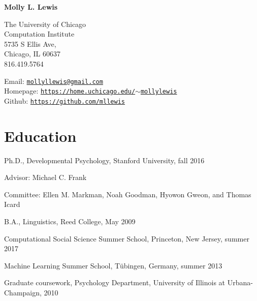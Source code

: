 \documentclass[letterpaper]{article}
\def\name{Molly L.  Lewis}
\renewenvironment{itemize}{
  \begin{list}{}{
    \setlength{\leftmargin}{1.5em}
  }
}{
  \end{list}
}
\begin{document}
\centerline{\huge \bf \name}
\vspace{0.25in}


 \normalsize
  
  The University of Chicago  \\
  Computation Institute \\
  5735 S Ellis Ave,\\
 Chicago, IL 60637\\
 816.419.5764\\
  
  \begin{minipage}{0.45\linewidth}

Email: \href{mailto:mollyllewis@gmail.com}{\tt mollyllewis@gmail.com}\\
Homepage: \href{http://home.uchicago.edu/~mollylewis}{\tt https://home.uchicago.edu/$\sim$mollylewis}\\
Github: \href{https://github.com/mllewis}{\tt https://github.com/mllewis}\\

 
\end{minipage}


\section*{Education}

\begin{itemize}
  \item Ph.D., Developmental Psychology, Stanford University, fall 2016
  \begin{itemize}
  	\item Advisor: Michael C. Frank
	\item Committee: Ellen M. Markman, Noah Goodman, Hyowon Gweon, and Thomas Icard
   \end{itemize}
  \item B.A., Linguistics, Reed College, May 2009
     \item Computational Social Science Summer School, Princeton, New Jersey, summer 2017
   \item Machine Learning Summer School, T\"{u}bingen, Germany, summer 2013 
   \item Graduate coursework, Psychology Department, University of Illinois at Urbana-Champaign, 2010
\end{itemize}
\end{document}
